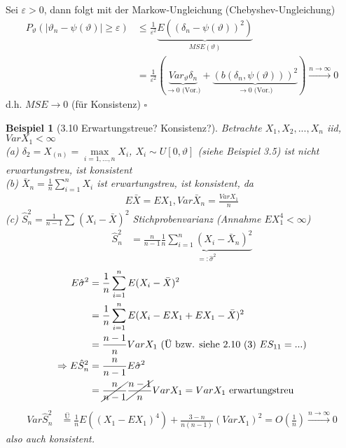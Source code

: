 \documentclass[a4paper,openany]{book}
\theoremstyle{mytheoremstyle}
\newtheorem*{bei}{Beispiel}
\theoremstyle{mytheoremstyle2}
\newtheorem*{cbew}{Beweis}
\newenvironment{bew}[1][]{%
  \ifthenelse{\boolean{showbew}}{%
    \begin{cbew}[#1]%
  }{%
    \expandafter\comment%
  }%
}{%
  \ifthenelse{\boolean{showbew}}{%
    \end{cbew}%
  }{%
    \expandafter\endcomment%
  }%
}
\begin{document}
\begin{bew}[]
  Sei $\varepsilon >0$, dann folgt mit der Markow-Ungleichung (Chebyshev-Ungleichung)
  \begin{align*}
    P _{\vartheta }(|\vartheta _n-\psi (\vartheta )| \geq \varepsilon )
    &\leq \frac{1}{\varepsilon ^2}\underbrace{E \left((\delta _n-\psi (\vartheta ))^2\right)}_{MSE(\vartheta )} \\
    &=\frac{1}{\varepsilon ^2}(\underbrace{Var _{\vartheta }\delta _n}_{\to0 \text{ (Vor.)}}+\underbrace{(b(\delta _n,\psi (\vartheta )))^2}_{\to0 \text{ (Vor.)}}) \overset{n\to \infty }\to0
  \end{align*}
  d.h. $MSE\to0$ (für Konsistenz) $\square$ 
\end{bew}
\begin{bei}[3.10 Erwartungstreue? Konsistenz?]
  Betrachte $X_1,X_2,...,X_n $ iid, $VarX_1 < \infty $ \\
  (a) $\delta _2=X _{(n)}=\max\limits_{i=1,...,n}X_i$, $X_i\sim U[0,\vartheta ]$  (siehe Beispiel 3.5) ist nicht erwartungstreu, ist konsistent \\
  (b) $\bar{X}_n=\frac{1}{n}\sum\limits_{i=1}^{n}{X_i}$ ist erwartungstreu, ist konsistent, da
  \begin{align*}
    E \bar{X}=EX_1,Var \bar{X}_n=\frac{VarX_1}{n} 
  \end{align*} 
  (c) $\hat{S}_n^2=\frac{1}{n-1}\sum_{}^{}{(X_i-\bar{X})^2}$ Stichprobenvarianz (Annahme $EX_1^4<\infty $)
  \begin{align*}
    \hat{S}_n^2&=\frac{n}{n-1}\underbrace{\frac{1}{n}\sum_{i=1}^{n}{(X_i-\bar{X}_n)^2}}_{=:\hat{\sigma }^2}
  \end{align*}
  \begin{align*}
    E \hat{\sigma }^2
    &=\frac{1}{n}\sum_{i=1}^{n}{E(X_i-\bar{X})^2} \\
    &=\frac{1}{n}\sum_{i=1}^{n}{E(X_i-EX_1+EX_1-\bar{X})^2} \\
    &=\frac{n-1}{n}VarX_1 \text{ (Ü bzw. siehe 2.10 (3) $ES _{11}=...$)} \\
    \Rightarrow E \hat{S}_n^2
    &=\frac{n}{n-1}E \hat{\sigma }^2 \\
    &=\cancel{\frac{n}{n-1}}\cancel{\frac{n-1}{n}}VarX_1=VarX_1 \text{ erwartungstreu}
  \end{align*}
  \begin{align*}
    Var \hat{S}_n^2
    &\overset{\text{Ü}}=\frac{1}{n}E((X_1-EX_1)^4)+\frac{3-n}{n(n-1)}(VarX_1)^2=O \left(\frac{1}{n}\right)\overset{n\to \infty }\to 0
  \end{align*}
  also auch konsistent.
\end{bei}
\end{document}
